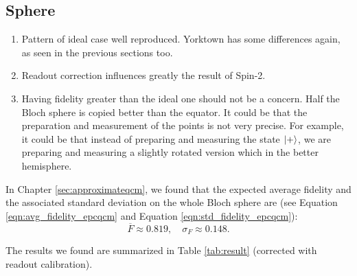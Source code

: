 \subsection{Sphere}

\begin{enumerate}
  \item Pattern of ideal case well reproduced. Yorktown has some differences again, as seen in the previous sections too.
  \item Readout correction influences greatly the result of Spin-2. 
  \item Having fidelity greater than the ideal one should not be a concern. Half the Bloch sphere is copied better than the equator. 
  It could be that the preparation and measurement of the points is not very precise. For example, it could be that instead of preparing and measuring the state $\ket{+}$, we are preparing and measuring a slightly rotated version which in the better hemisphere.
\end{enumerate} 

In Chapter \ref{sec:approximateqcm}, we found that the expected average fidelity and the associated standard deviation on the whole Bloch sphere are (see Equation \ref{eqn:avg_fidelity_epcqcm} and Equation \ref{eqn:std_fidelity_epcqcm}):
\[
  \overline{F}\approx0.819, \quad \sigma_{F}\approx0.148.
\]

The results we found are summarized in Table \ref{tab:result} (corrected with readout calibration).


